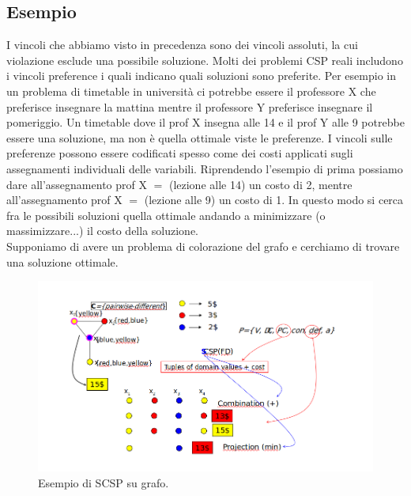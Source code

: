 \subsection{Esempio}
I vincoli che abbiamo visto in precedenza sono dei vincoli assoluti, la cui violazione esclude una possibile soluzione. Molti dei problemi CSP reali includono i vincoli preference i quali indicano quali soluzioni sono preferite. Per esempio in un problema di timetable in università ci potrebbe essere il professore X che preferisce insegnare la mattina mentre il professore Y preferisce insegnare il pomeriggio. Un timetable dove il prof X insegna alle 14 e il prof Y alle 9 potrebbe essere una soluzione, ma non è quella ottimale viste le preferenze. I vincoli sulle preferenze possono essere codificati spesso come dei costi applicati sugli assegnamenti individuali delle variabili. Riprendendo l'esempio di prima possiamo dare all'assegnamento prof X $=$ (lezione alle 14) un costo di 2, mentre all'assegnamento prof X $=$ (lezione alle 9) un costo di 1. In questo modo si cerca fra le possibili soluzioni quella ottimale andando a minimizzare (o massimizzare...) il costo della soluzione.
\\Supponiamo di avere un problema di colorazione del grafo e cerchiamo di trovare una
soluzione ottimale.
\begin{figure}[H]
    \centering
    \includegraphics[width=14cm, keepaspectratio]{img/Cap4/scsp2.png}
    \caption{Esempio di SCSP su grafo.}
\end{figure}

